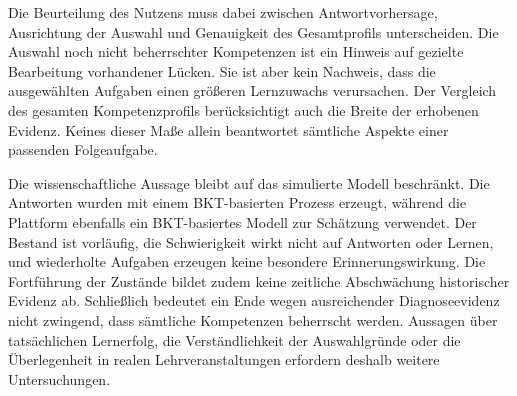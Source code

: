 Die Beurteilung des Nutzens muss dabei zwischen Antwortvorhersage,
Ausrichtung der Auswahl und Genauigkeit des Gesamtprofils unterscheiden.
Die Auswahl noch nicht beherrschter Kompetenzen ist ein Hinweis auf
gezielte Bearbeitung vorhandener Lücken. Sie ist aber kein Nachweis, dass
die ausgewählten Aufgaben einen größeren Lernzuwachs verursachen.
Der Vergleich des gesamten Kompetenzprofils berücksichtigt auch die
Breite der erhobenen Evidenz. Keines dieser Maße allein beantwortet
sämtliche Aspekte einer passenden Folgeaufgabe.

Die wissenschaftliche Aussage bleibt auf das simulierte Modell
beschränkt. Die Antworten wurden mit einem BKT-basierten Prozess erzeugt,
während die Plattform ebenfalls ein BKT-basiertes Modell zur Schätzung
verwendet. Der Bestand ist vorläufig, die Schwierigkeit wirkt nicht auf
Antworten oder Lernen, und wiederholte Aufgaben erzeugen keine besondere
Erinnerungswirkung. Die Fortführung der Zustände bildet zudem keine
zeitliche Abschwächung historischer Evidenz ab. Schließlich bedeutet ein
Ende wegen ausreichender Diagnoseevidenz nicht zwingend, dass sämtliche
Kompetenzen beherrscht werden. Aussagen über tatsächlichen Lernerfolg,
die Verständlichkeit der Auswahlgründe oder die Überlegenheit in realen
Lehrveranstaltungen erfordern deshalb weitere Untersuchungen.
